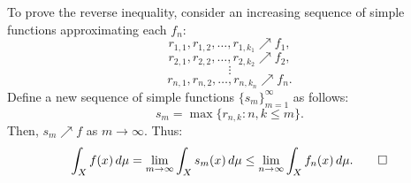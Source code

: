 \documentclass[11pt]{article}
\begin{document}
To prove the reverse inequality, consider an increasing sequence of simple functions approximating each \(f_n\):
\[r_{1,1}, r_{1,2}, \ldots, r_{1,k_1} \nearrow f_1,\]
\[r_{2,1}, r_{2,2}, \ldots, r_{2,k_2} \nearrow f_2,\]
\[\vdots\]
\[r_{n,1}, r_{n,2}, \ldots, r_{n,k_n} \nearrow f_n.\]
Define a new sequence of simple functions \(\{s_m\}_{m=1}^{\infty}\) as follows:
\[s_m = \max\{r_{n,k} : n, k \leq m\}.\]
Then, \(s_m \nearrow f\) as \(m \to \infty\). Thus:
\[\int_X f(x) \,d\mu = \lim_{m \to \infty} \int_X s_m(x) \,d\mu \leq \lim_{n \to \infty} \int_X f_n(x) \,d\mu. \qed\]
\end{document}
